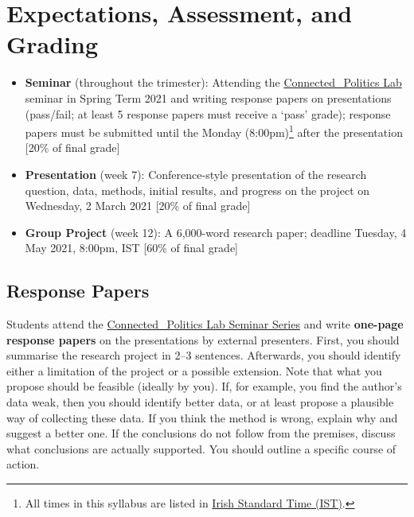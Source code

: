 \documentclass[abstract=on,parskip=full,headings=standardclasses,fontsize=11pt,paper=a4]{scrartcl}
\begin{document}
\section*{Expectations, Assessment, and Grading}


\begin{itemize}
\item \textbf{Seminar} (throughout the trimester): Attending the \href{https://www.ucd.ie/connected_politics/events/}{Connected\_Politics Lab} seminar in Spring Term 2021 and writing response papers on presentations (pass/fail; at least 5 response papers must receive a `pass'  grade); response papers must be submitted until the Monday (8:00pm)\footnote{All times in this syllabus are listed in \href{https://www.timeanddate.com/time/zones/ist-ireland}{Irish Standard Time (IST)}.} after  the presentation [20\% of final grade]
\item \textbf{Presentation} (week 7):  Conference-style presentation of the research question, data, methods, initial results, and progress on the project  on Wednesday, 2 March 2021 [20\% of final grade]
\item \textbf{Group Project} (week 12): A 6,000-word research paper; deadline Tuesday, 4 May 2021, 8:00pm, IST	  [60\% of final grade]
\end{itemize}





\subsection*{Response Papers}


Students attend the \href{https://www.ucd.ie/connected_politics/events/}{Connected\_Politics Lab Seminar Series} and write \textbf{one-page response papers} on the presentations by external presenters. First, you should summarise the research project in 2--3 sentences. Afterwards,  you should identify either a limitation of the project or a possible extension. Note that what you propose should be feasible (ideally by you). If, for example, you find the author's data weak, then you should identify better data, or at least propose a plausible way of collecting these data. If you think the method is wrong, explain why and suggest a better one. If the conclusions do not follow from the premises, discuss what conclusions are actually supported.  You should outline a specific course of action.  
 
\end{document}
